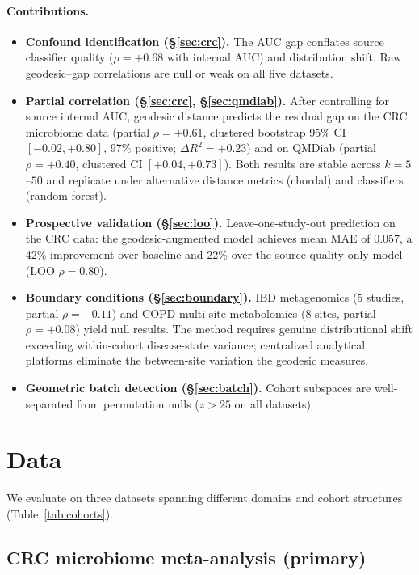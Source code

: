 \documentclass{article}
\begin{document}
\paragraph{Contributions.}
\begin{itemize}
\item \textbf{Confound identification (\S\ref{sec:crc}).} The AUC gap conflates source classifier quality ($\rho = +0.68$ with internal AUC) and distribution shift. Raw geodesic--gap correlations are null or weak on all five datasets.
\item \textbf{Partial correlation (\S\ref{sec:crc}, \S\ref{sec:qmdiab}).} After controlling for source internal AUC, geodesic distance predicts the residual gap on the CRC microbiome data (partial $\rho = +0.61$, clustered bootstrap 95\% CI $[-0.02, +0.80]$, 97\% positive; $\Delta R^2 = +0.23$) and on QMDiab (partial $\rho = +0.40$, clustered CI $[+0.04, +0.73]$). Both results are stable across $k = 5$--$50$ and replicate under alternative distance metrics (chordal) and classifiers (random forest).
\item \textbf{Prospective validation (\S\ref{sec:loo}).} Leave-one-study-out prediction on the CRC data: the geodesic-augmented model achieves mean MAE of 0.057, a 42\% improvement over baseline and 22\% over the source-quality-only model (LOO $\rho = 0.80$).
\item \textbf{Boundary conditions (\S\ref{sec:boundary}).} IBD metagenomics (5 studies, partial $\rho = -0.11$) and COPD multi-site metabolomics (8 sites, partial $\rho = +0.08$) yield null results. The method requires genuine distributional shift exceeding within-cohort disease-state variance; centralized analytical platforms eliminate the between-site variation the geodesic measures.
\item \textbf{Geometric batch detection (\S\ref{sec:batch}).} Cohort subspaces are well-separated from permutation nulls ($z > 25$ on all datasets).
\end{itemize}


\section{Data}

We evaluate on three datasets spanning different domains and cohort structures (Table~\ref{tab:cohorts}).

\subsection{CRC microbiome meta-analysis (primary)}
\label{sec:crc_data}
\end{document}
